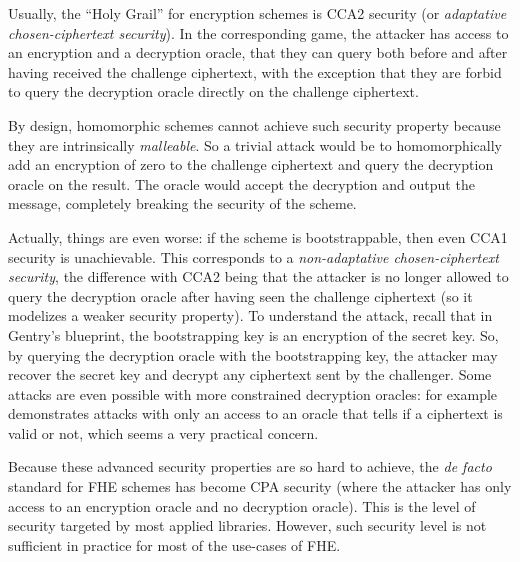 Usually, the ``Holy Grail'' for encryption schemes is \textsf{CCA2} security (or \textit{adaptative chosen-ciphertext security}). In the corresponding game, the attacker has access to an encryption and a decryption oracle, that they can query both before and after having received the challenge ciphertext, with the exception that they are forbid to query the decryption oracle directly on the challenge ciphertext.



By design, homomorphic schemes cannot achieve such security property because they are intrinsically \textit{malleable}. So a trivial attack would be to homomorphically add an encryption of zero to the challenge ciphertext and query the decryption oracle on the result. The oracle would accept the decryption and output the message, completely breaking the security of the scheme.

Actually, things are even worse: if the scheme is bootstrappable, then even \textsf{CCA1} security is unachievable. This corresponds to a \textit{non-adaptative chosen-ciphertext security}, the difference with \textsf{CCA2} being that the attacker is no longer allowed to query the decryption oracle after having seen the challenge ciphertext (so it modelizes a weaker security property). To understand the attack, recall that in Gentry's blueprint, the bootstrapping key is an encryption of the secret key. So, by querying the decryption oracle with the bootstrapping key, the attacker may recover the secret key and decrypt any ciphertext sent by the challenger. Some attacks are even possible with more constrained decryption oracles: for example \cite{SAC:LMSV11} demonstrates attacks with only an access to an oracle that tells if a ciphertext is valid or not, which seems a very practical concern.


Because these advanced security properties are so hard to achieve, the \textit{de facto} standard for \gls{FHE} schemes has become \textsf{CPA} security (where the attacker has only access to an encryption oracle and no decryption oracle). This is the level of security targeted by most applied libraries. However, such security level is not sufficient in practice for most of the use-cases of \gls{FHE}.


